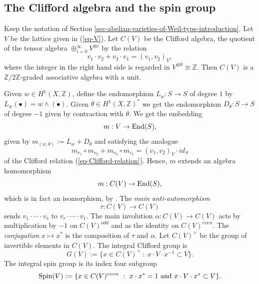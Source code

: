 \documentclass[12pt]{amsart}
\numberwithin{equation}{subsection}
\theoremstyle{plain}
\theoremstyle{definition}
\newcommand{\ZZ}{{\mathbb Z}}
\newcommand{\Integers}{{\mathbb Z}}
\newcommand{\Spin}{{\rm Spin}}
\newcommand{\End}{{\rm End}}
\begin{document}
\subsection{The Clifford algebra and the spin group}
\label{sec-clifford-algebra}

Keep the notation of Section \ref{sec-abelian-varieties-of-Weil-type-introduction}.
Let $V$ be the lattice given in (\ref{eq-V}).
Let $C(V)$ be the Clifford algebra, the quotient of the tensor algebra $\oplus_{i=0}^\infty V^{\otimes i}$ by the relation
\begin{equation}
\label{eq-Clifford-relation}
v_1\cdot v_2+v_2\cdot v_1=(v_1,v_2)_V, 
\end{equation}
where the integer in the right hand side is regarded in $V^{\otimes 0}\cong \Integers.$ Then $C(V)$ is a $\Integers/2\Integers$-graded associative algebra with a unit.

Given $w\in H^1(X,\ZZ)$, define the endomorphism $L_w:S\rightarrow S$ of degree $1$ by $L_w(\bullet)=w\wedge(\bullet)$.
Given $\theta\in H^1(X,\ZZ)^*$ we get the endomorphism $D_\theta:S\rightarrow S$ of degree $-1$ given by contraction with $\theta$.
We get the embedding 
\begin{equation}
\label{eq-embedding-of-V-in-End-S}
m:V\rightarrow\End(S),
\end{equation} 
given by $m_{(w,\theta)}:=L_w+D_\theta$ and 
satisfying the analogue 
\[
m_{v_1}\circ m_{v_2}+m_{v_2}\circ m_{v_1}=(v_1,v_2)_V\cdot id_S
\]
of the Clifford relation (\ref{eq-Clifford-relation}). Hence, $m$ extends an algebra homomorphism
\begin{equation}
\label{eq-m}
m:C(V)\rightarrow \End(S),
\end{equation}
which is in fact an isomorphism, by
\cite[Prop. 3.2.1(e)]{golyshev-luntz-orlov}. The {\em main anti-automorphism} 
\[
\tau:C(V)\rightarrow C(V)
\]
sends $v_1\cdot \cdots \cdot v_r$ to $v_r\cdot \cdots\cdot v_1$.
The main involution $\alpha:C(V)\rightarrow C(V)$ acts by multiplication by $-1$ on $C(V)^{odd}$ and as the identity on $C(V)^{even}$. The {\em conjugation} $x\mapsto x^*$ is the composition of $\tau$ and $\alpha$.
Let $C(V)^\times$ be the group of invertible elements in $C(V)$. The integral Clifford group is 
\[
G(V):= \{x\in C(V)^\times \ : \ x\cdot V\cdot x^{-1}\subset V\}.
\]
The integral spin group is its index four subgroup
\[
\Spin(V) := \{x\in C(V)^{even} \ : \ x\cdot x^*=1 \ \mbox{and} \ x\cdot V\cdot x^*\subset V \}.
\]
\end{document}
